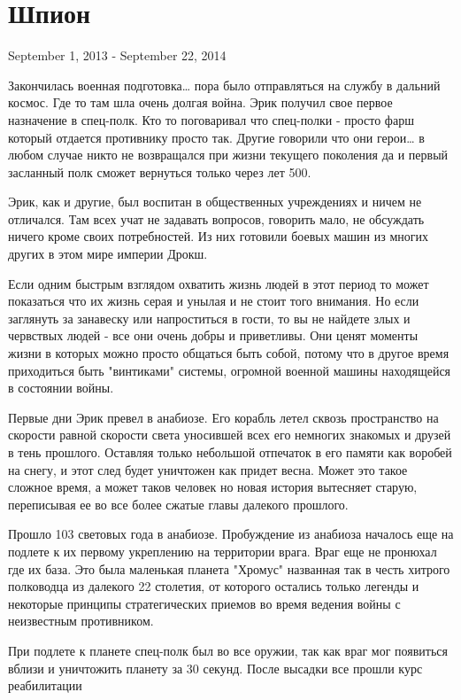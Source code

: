 \newpage
\chapter{Шпион}
{\centering
	September 1, 2013 - September 22, 2014\par
}
\par
Закончилась военная подготовка… пора было отправляться
на службу в дальний космос. Где то там шла очень долгая война.
Эрик получил свое первое назначение в спец-полк.
Кто то поговаривал что спец-полки - просто фарш который отдается
противнику просто так. Другие говорили что они герои… в любом случае
никто не возвращался при жизни текущего поколения да и первый засланный
полк сможет вернуться только через лет 500.
\par
Эрик, как и другие, был воспитан в общественных учреждениях и
ничем не отличался. Там всех учат не задавать вопросов, говорить мало,
не обсуждать ничего кроме своих потребностей. Из них готовили боевых машин
из многих других в этом мире империи Дрокш.
\par
Если одним быстрым взглядом охватить жизнь людей в этот период то может
показаться что их жизнь серая и унылая и не стоит того внимания.
Но если заглянуть за занавеску или напроститься в гости, то вы не найдете
злых и червствых людей - все они очень добры и приветливы.
Они ценят моменты жизни в которых можно просто общаться быть собой,
потому что в другое время приходиться быть "винтиками" системы, огромной военной машины
находящейся в состоянии войны.
\par
Первые дни Эрик превел в анабиозе. Его корабль летел сквозь пространство 
на скорости равной скорости света уносившей всех его немногих знакомых и друзей
в тень прошлого. Оставляя только небольшой отпечаток в его памяти как воробей на 
снегу, и этот след будет уничтожен как придет весна. Может это такое сложное время,
а может таков человек но новая история вытесняет старую, переписывая ее во все более
сжатые главы далекого прошлого.
\par
Прошло 103 световых года в анабиозе.
Пробуждение из анабиоза началось еще на подлете к их первому укреплению на территории врага.
Враг еще не пронюхал где их база. Это была маленькая планета "Хромус" названная так в честь
хитрого полководца из далекого 22 столетия, от которого остались только легенды
и некоторые принципы стратегических приемов во время ведения войны с неизвестным противником.
\par
При подлете к планете спец-полк был во все оружии, так как враг мог появиться вблизи
и уничтожить планету за 30 секунд. После высадки все прошли курс реабилитации
